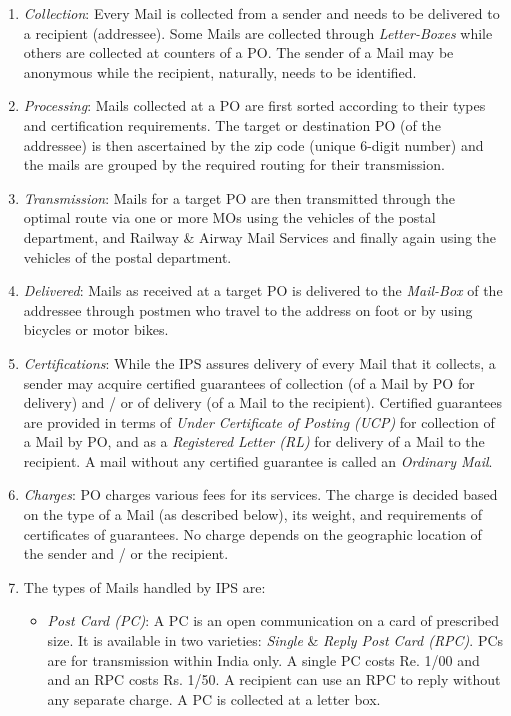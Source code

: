 \documentclass{article}
\begin{document}
\begin{enumerate}
\begin{enumerate}
\item {\em Collection}: Every Mail is collected from a sender and needs to be delivered to a recipient (addressee). Some Mails are collected through {\em Letter-Boxes} while others are collected at counters of a PO. The sender of a Mail may be anonymous while the recipient, naturally, needs to be identified. 

\item {\em Processing}: Mails collected at a PO are first sorted according to their types and certification requirements. The target or destination PO (of the addressee) is then ascertained by the zip code (unique 6-digit number) and the mails are grouped by the required routing for their transmission.

\item {\em Transmission}: Mails for a target PO are then transmitted through the optimal route via one or more MOs using the vehicles of the postal department, and Railway \& Airway Mail Services and finally again using the vehicles of the postal department. 

\item {\em Delivered}: Mails as received at a target PO is delivered to the {\em Mail-Box} of the addressee through postmen who travel to the address on foot or by using bicycles or motor bikes.

\item {\em Certifications}: While the IPS assures delivery of every Mail that it collects, a sender may acquire certified guarantees of collection (of a Mail by PO for delivery) and / or of delivery (of a Mail to the recipient). Certified guarantees are provided in terms of {\em Under Certificate of Posting (UCP)} for collection of a Mail by PO, and as a {\em Registered Letter (RL)} for delivery of a Mail to the recipient. A mail without any certified guarantee is called an {\em Ordinary Mail}.

\item {\em Charges}: PO charges various fees for its services. The charge is decided based on the type of a Mail (as described below), its weight, and requirements of certificates of guarantees. No charge depends on the geographic location of the sender and / or the recipient.

\item The types of Mails handled by IPS are:

\begin{itemize}
\item {\em Post Card (PC)}: A PC is an open communication on a card of prescribed size. It is available in two varieties: {\em Single} \& {\em Reply Post Card (RPC)}. PCs are for transmission within India only. A single PC costs Re. 1/00 and and an RPC costs Rs. 1/50. A recipient can use an RPC to reply without any separate charge. A PC is collected at a letter box. 


\end{itemize}
\end{enumerate}
\end{enumerate}
\end{document}

